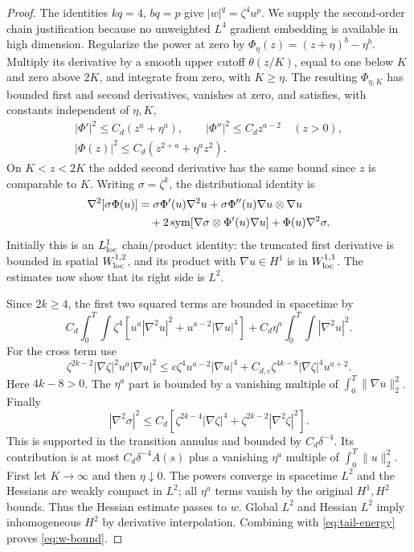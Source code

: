 \documentclass[11pt]{article}
\numberwithin{equation}{section}
\theoremstyle{definition}
\theoremstyle{remark}
\newcommand{\norm}[1]{\lVert #1\rVert}
\begin{document}
\begin{proof}
The identities $kq=4$, $bq=p$ give $|w|^q=\zeta^4u^p$.
We supply the second-order chain justification because no unweighted
$L^4$ gradient embedding is available in high dimension.
Regularize the power at zero by
$\Phi_\eta(z)=(z+\eta)^b-\eta^b$.
Multiply its derivative by a smooth upper cutoff $\theta(z/K)$, equal to
one below $K$ and zero above $2K$, and integrate from zero, with $K\ge\eta$.
The resulting $\Phi_{\eta,K}$ has bounded first and second derivatives,
vanishes at zero, and satisfies, with constants independent of $\eta,K$,
\begin{gather*}
 |\Phi'|^2\le C_d(z^a+\eta^a),\qquad
 |\Phi''|^2\le C_d z^{a-2}\quad(z>0),\\
 |\Phi(z)|^2\le C_d(z^{2+a}+\eta^a z^2).
\end{gather*}
On $K<z<2K$ the added second derivative has the same bound since $z$
is comparable to $K$.
Writing $\sigma=\zeta^k$, the distributional identity is
\begin{align}\label{eq:power-Hessian}
 \nabla^2[\sigma\Phi(u)]
 &=\sigma\Phi'(u)\nabla^2u
   +\sigma\Phi''(u)\nabla u\otimes\nabla u\notag\\
 &\quad+2\operatorname{sym}[\nabla\sigma\otimes\Phi'(u)\nabla u]
                       +\Phi(u)\nabla^2\sigma.
\end{align}
Initially this is an $L^1_{\rm loc}$ chain/product identity: the truncated
first derivative is bounded in spatial $W^{1,2}_{\rm loc}$, and its
product with $\nabla u\in H^1$ is in $W^{1,1}_{\rm loc}$.
The estimates now show that its right side is $L^2$.

Since $2k\ge4$, the first two squared terms are bounded in spacetime by
\[
 C_d\int_0^T\!\int\zeta^4
       [u^a|\nabla^2u|^2+u^{a-2}|\nabla u|^4]
            +C_d\eta^a\int_0^T\!\int|\nabla^2u|^2.
\]
For the cross term use
\[
 \zeta^{2k-2}|\nabla\zeta|^2u^a|\nabla u|^2
 \le c\zeta^4u^{a-2}|\nabla u|^4
          +C_{d,c}\zeta^{4k-8}|\nabla\zeta|^4u^{a+2}.
\]
Here $4k-8>0$. The $\eta^a$ part is bounded by a vanishing multiple
of $\int_0^T\norm{\nabla u}_2^2$.
Finally
\[
 |\nabla^2\sigma|^2\le C_d[
     \zeta^{2k-4}|\nabla\zeta|^4
                   +\zeta^{2k-2}|\nabla^2\zeta|^2].
\]
This is supported in the transition annulus and bounded by
$C_d\delta^{-4}$. Its contribution is at most
$C_d\delta^{-4}A(s)$ plus a vanishing $\eta^a$ multiple of
$\int_0^T\norm u_2^2$.
First let $K\to\infty$ and then $\eta\downarrow0$.
The powers converge in spacetime $L^2$ and the Hessians are weakly
compact in $L^2$; all $\eta^a$ terms vanish by the original $H^1,H^2$
bounds. Thus the Hessian estimate passes to $w$.
Global $L^2$ and Hessian $L^2$ imply inhomogeneous $H^2$ by derivative
interpolation. Combining with \eqref{eq:tail-energy} proves
\eqref{eq:w-bound}.
\end{proof}
\end{document}
